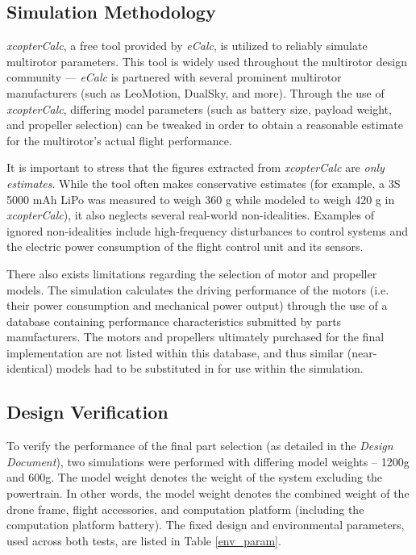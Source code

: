 \subsection{Simulation Methodology}
\textit{xcopterCalc}\cite{ecalc}, a free tool provided by \textit{eCalc}, is utilized to reliably simulate multirotor parameters. This tool is widely used throughout the multirotor design community --- \textit{eCalc} is partnered with several prominent multirotor manufacturers (such as LeoMotion, DualSky, and more)\cite{ecalcpartner}. Through the use of \textit{xcopterCalc}, differing model parameters (such as battery size, payload weight, and propeller selection) can be tweaked in order to obtain a reasonable estimate for the multirotor's actual flight performance. 

It is important to stress that the figures extracted from \textit{xcopterCalc} are \textit{only estimates}. While the tool often makes conservative estimates (for example, a 3S 5000 mAh LiPo was measured to weigh 360 g while modeled to weigh 420 g in \textit{xcopterCalc}), it also neglects several real-world non-idealities. Examples of ignored non-idealities include high-frequency disturbances to control systems and the electric power consumption of the flight control unit and its sensors. 

There also exists limitations regarding the selection of motor and propeller models. The simulation calculates the driving performance of the motors (i.e. their power consumption and mechanical power output) through the use of a database containing performance characteristics submitted by parts manufacturers. The motors and propellers ultimately purchased for the final implementation are not listed within this database, and thus similar (near-identical) models had to be substituted in for use within the simulation.

\subsection{Design Verification}
To verify the performance of the final part selection (as detailed in the \textit{Design Document}), two simulations were performed with differing model weights -- 1200g and 600g. The model weight denotes the weight of the system excluding the powertrain. In other words, the model weight denotes the combined weight of the drone frame, flight accessories, and computation platform (including the computation platform battery). The fixed design and environmental parameters, used across both tests, are listed in Table \ref{env_param}.

